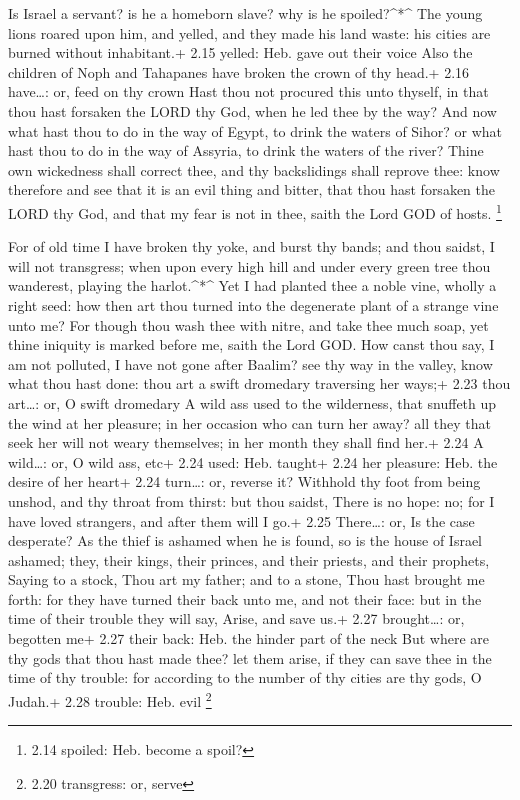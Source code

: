  Is Israel a servant? is he a homeborn slave? why is he
spoiled?\^{}*\^{}  The young lions roared upon him, and
yelled, and they made his land waste: his cities are burned without
inhabitant.+ 2.15 yelled: Heb. gave out their voice  Also
the children of Noph and Tahapanes have broken the crown of thy head.+
2.16 have\ldots: or, feed on thy crown  Hast thou not
procured this unto thyself, in that thou hast forsaken the LORD thy God,
when he led thee by the way?  And now what hast thou to do
in the way of Egypt, to drink the waters of Sihor? or what hast thou to
do in the way of Assyria, to drink the waters of the river?
 Thine own wickedness shall correct thee, and thy
backslidings shall reprove thee: know therefore and see that it is an
evil thing and bitter, that thou hast forsaken the LORD thy God, and
that my fear is not in thee, saith the Lord GOD of hosts. \footnote{2.14
  spoiled: Heb. become a spoil?}

 For of old time I have broken thy yoke, and burst thy
bands; and thou saidst, I will not transgress; when upon every high hill
and under every green tree thou wanderest, playing the harlot.\^{}*\^{}
 Yet I had planted thee a noble vine, wholly a right seed:
how then art thou turned into the degenerate plant of a strange vine
unto me?  For though thou wash thee with nitre, and take
thee much soap, yet thine iniquity is marked before me, saith the Lord
GOD.  How canst thou say, I am not polluted, I have not
gone after Baalim? see thy way in the valley, know what thou hast done:
thou art a swift dromedary traversing her ways;+ 2.23 thou art\ldots:
or, O swift dromedary  A wild ass used to the wilderness,
that snuffeth up the wind at her pleasure; in her occasion who can turn
her away? all they that seek her will not weary themselves; in her month
they shall find her.+ 2.24 A wild\ldots: or, O wild ass, etc+ 2.24 used:
Heb. taught+ 2.24 her pleasure: Heb. the desire of her heart+ 2.24
turn\ldots: or, reverse it?  Withhold thy foot from being
unshod, and thy throat from thirst: but thou saidst, There is no hope:
no; for I have loved strangers, and after them will I go.+ 2.25
There\ldots: or, Is the case desperate?  As the thief is
ashamed when he is found, so is the house of Israel ashamed; they, their
kings, their princes, and their priests, and their prophets,
 Saying to a stock, Thou art my father; and to a stone,
Thou hast brought me forth: for they have turned their back unto me, and
not their face: but in the time of their trouble they will say, Arise,
and save us.+ 2.27 brought\ldots: or, begotten me+ 2.27 their back: Heb.
the hinder part of the neck  But where are thy gods that
thou hast made thee? let them arise, if they can save thee in the time
of thy trouble: for according to the number of thy cities are thy gods,
O Judah.+ 2.28 trouble: Heb. evil \footnote{2.20 transgress: or, serve}

